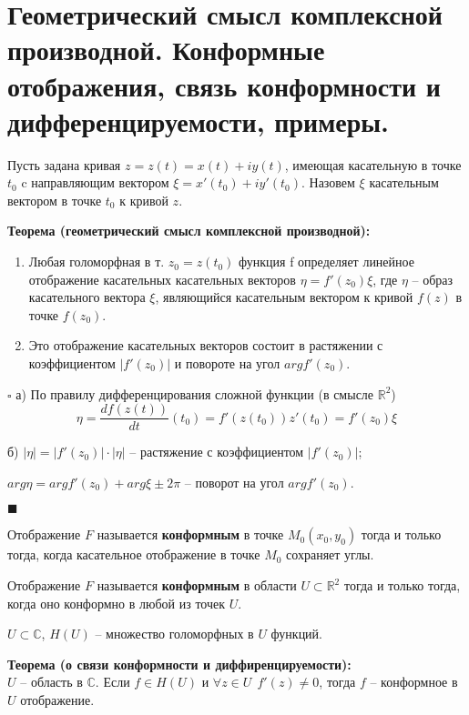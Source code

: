\newpage
\section{Геометрический смысл комплексной производной. Конформные отображения,
связь конформности и дифференцируемости, примеры.}

Пусть задана кривая $z = z(t) = x(t) + iy(t)$, имеющая касательную в точке $t_0$ c направляющим вектором $\xi = x'(t_0) + iy'(t_0)$.
Назовем $\xi$ касательным вектором в точке $t_0$ к кривой $z$.

\begin{samepage}
\textbf{Теорема (геометрический смысл комплексной производной):}
\begin{enumerate}
  \item Любая голоморфная в т. $z_0 = z(t_0)$ функция f определяет линейное отображение касательных касательных векторов $\eta = f'(z_0)\xi$, где $\eta$ -- образ касательного вектора $\xi$, являющийся касательным вектором к кривой $f(z)$ в точке $f(z_0)$.
  \item Это отображение касательных векторов состоит в растяжении с коэффициентом $|f'(z_0)|$ и повороте на угол $arg f'(z_0)$.
\end{enumerate}
\end{samepage}

$\square$
а) По правилу дифференцирования сложной функции (в смысле $\mathbb{R}^2$)
$$\eta = \frac{df(z(t))}{dt} (t_0) = f'(z(t_0))z'(t_0) = f'(z_0)\xi$$

б) $|\eta| = |f'(z_0)| \cdot |\eta|$ -- растяжение с коэффициентом $|f'(z_0)|$; 

$arg \eta = arg f'(z_0) + arg \xi \pm 2\pi$ -- поворот на угол $arg f'(z_0)$.

\hfill$\blacksquare$

Отображение $F$ называется \textbf{конформным} в точке $M_0(x_0,y_0)$ тогда и только тогда, когда касательное отображение в точке $M_0$ сохраняет углы.

Отображение $F$ называется \textbf{конформным} в области $U \subset \mathbb{R}^2$ тогда и только тогда, когда оно конформно в любой из точек $U$.

$U\subset \mathbb{C}$, $H(U)$ -- множество голоморфных в $U$ функций.

\textbf{Теорема (о связи конформности и диффиренцируемости):}\\
$U$ -- область в $\mathbb{C}$. Если $f\in H(U)$ и $\forall z\in U~~f'(z) \neq 0$, тогда $f$ -- конформное в $U$ отображение.

